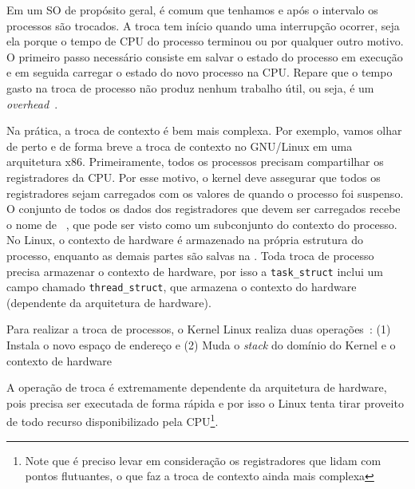 Em um SO de propósito geral, é comum que tenhamos  e após o intervalo os processos são
trocados. A troca tem início quando uma interrupção  ocorrer, seja ela porque o
tempo de CPU do processo terminou ou por qualquer outro motivo. O primeiro
passo necessário consiste em salvar o estado do processo em execução e em
seguida carregar o estado do novo processo na CPU. Repare que o tempo gasto na
troca de processo não produz nenhum trabalho útil, ou seja, é um
\textit{overhead}~\citep{silberschatz}.

Na prática, a troca de contexto é bem mais complexa. Por exemplo, vamos olhar de
perto e de forma breve a troca de contexto no GNU/Linux em uma arquitetura x86.
Primeiramente, todos os processos precisam compartilhar os registradores da
CPU. Por esse motivo, o kernel deve assegurar que todos os registradores sejam
carregados com os valores de quando o processo foi suspenso. O conjunto de
todos os dados dos registradores que devem ser carregados recebe o nome de
~\citep{entendendo_kernel}, que pode ser
visto como um subconjunto do contexto do processo. No Linux, o contexto de hardware
é armazenado na própria estrutura do processo, enquanto as demais partes são salvas na
. Toda troca de processo precisa armazenar o contexto de
hardware, por isso a \texttt{task\_struct} inclui um campo chamado
\texttt{thread\_struct}, que armazena o contexto do hardware (dependente da
arquitetura de hardware).

Para realizar a troca de processos, o Kernel Linux realiza duas
operações~\citep{entendendo_kernel}: (1) Instala o novo espaço de endereço e
(2) Muda o \emph{stack} do domínio do Kernel e o contexto de hardware


A operação de troca é extremamente dependente da arquitetura de hardware, pois
precisa ser executada de forma rápida e por isso o Linux tenta tirar proveito
de todo recurso disponibilizado pela CPU\footnote{Note que é preciso levar em
consideração os registradores que lidam com pontos flutuantes, o que faz a troca
de contexto ainda mais complexa}.

